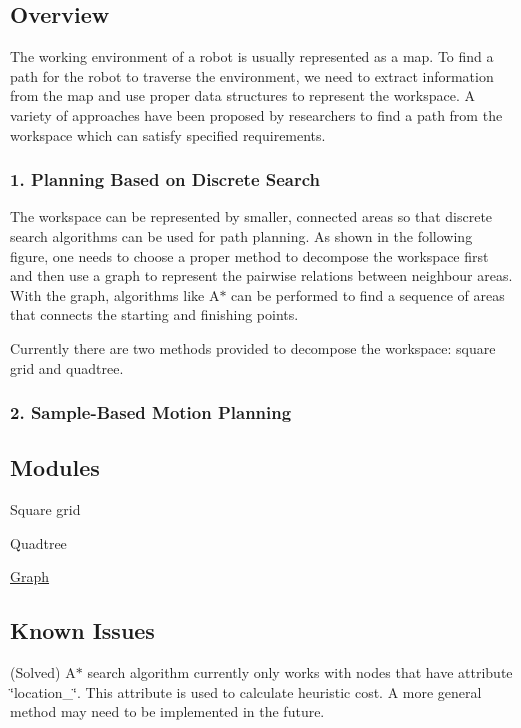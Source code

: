 \subsection*{Overview}

The working environment of a robot is usually represented as a map. To find a path for the robot to traverse the environment, we need to extract information from the map and use proper data structures to represent the workspace. A variety of approaches have been proposed by researchers to find a path from the workspace which can satisfy specified requirements.

\subsubsection*{1. Planning Based on Discrete Search}

The workspace can be represented by smaller, connected areas so that discrete search algorithms can be used for path planning. As shown in the following figure, one needs to choose a proper method to decompose the workspace first and then use a graph to represent the pairwise relations between neighbour areas. With the graph, algorithms like A$\ast$ can be performed to find a sequence of areas that connects the starting and finishing points.

 Currently there are two methods provided to decompose the workspace\-: square grid and quadtree.

\subsubsection*{2. Sample-\/\-Based Motion Planning}

\subsection*{Modules}


\begin{DoxyItemize}
\item Square grid
\item Quadtree
\item \hyperlink{graph}{Graph}
\end{DoxyItemize}

\subsection*{Known Issues}


\begin{DoxyItemize}
\item (Solved) A$\ast$ search algorithm currently only works with nodes that have attribute \char`\"{}location\-\_\-\char`\"{}. This attribute is used to calculate heuristic cost. A more general method may need to be implemented in the future. 
\end{DoxyItemize}